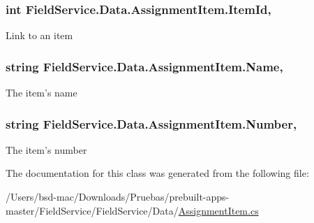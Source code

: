 \hypertarget{class_field_service_1_1_data_1_1_assignment_item_ac3061bd4a39adb4e7cc9a42b896cf4f6}{
\subsubsection[{Item\+Id}]{\setlength{\rightskip}{0pt plus 5cm}int Field\+Service.\+Data.\+Assignment\+Item.\+Item\+Id\hspace{0.3cm}{\ttfamily [get]}, {\ttfamily [set]}}}\label{class_field_service_1_1_data_1_1_assignment_item_ac3061bd4a39adb4e7cc9a42b896cf4f6}


Link to an item 

\hypertarget{class_field_service_1_1_data_1_1_assignment_item_a50377e616fb77004a27069c92d3bc386}{
\subsubsection[{Name}]{\setlength{\rightskip}{0pt plus 5cm}string Field\+Service.\+Data.\+Assignment\+Item.\+Name\hspace{0.3cm}{\ttfamily [get]}, {\ttfamily [set]}}}\label{class_field_service_1_1_data_1_1_assignment_item_a50377e616fb77004a27069c92d3bc386}


The item's name 

\hypertarget{class_field_service_1_1_data_1_1_assignment_item_a4b502f76ea42517efb1fe440d7aee9e1}{
\subsubsection[{Number}]{\setlength{\rightskip}{0pt plus 5cm}string Field\+Service.\+Data.\+Assignment\+Item.\+Number\hspace{0.3cm}{\ttfamily [get]}, {\ttfamily [set]}}}\label{class_field_service_1_1_data_1_1_assignment_item_a4b502f76ea42517efb1fe440d7aee9e1}


The item's number 



The documentation for this class was generated from the following file\+:\begin{DoxyCompactItemize}
\item 
/\+Users/bsd-\/mac/\+Downloads/\+Pruebas/prebuilt-\/apps-\/master/\+Field\+Service/\+Field\+Service/\+Data/\hyperlink{_assignment_item_8cs}{Assignment\+Item.\+cs}\end{DoxyCompactItemize}
